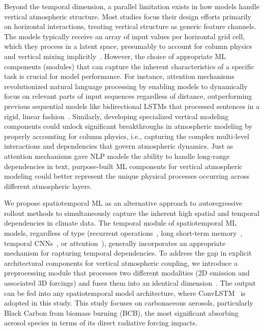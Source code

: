 \documentclass[11pt]{article}
\begin{document}
    Beyond the temporal dimension, a parallel limitation exists in how models handle vertical atmospheric structure. Most studies focus their design efforts primarily on horizontal interactions, treating vertical structure as generic feature channels. The models typically receive an array of input values per horizontal grid cell, which they process in a latent space, presumably to account for column physics and vertical mixing implicitly~\cite{lam2023learning,lang2024aifs}. However, the choice of appropriate ML components (modules) that can capture the inherent characteristics of a specific task is crucial for model performance. For instance, attention mechanisms~\cite{vaswani2017attention} revolutionized natural language processing by enabling models to dynamically focus on relevant parts of input sequences regardless of distance, outperforming previous sequential models like bidirectional LSTMs that processed sentences in a rigid, linear fashion~\cite{peters2018deep}. Similarly, developing specialized vertical modeling components could unlock significant breakthroughs in atmospheric modeling by properly accounting for column physics, i.e., capturing the complex multi-level interactions and dependencies that govern atmospheric dynamics. Just as attention mechanisms gave NLP models the ability to handle long-range dependencies in text, purpose-built ML components for vertical atmospheric modeling could better represent the unique physical processes occurring across different atmospheric layers.

    We propose spatiotemporal ML as an alternative approach to autoregressive rollout methods to simultaneously capture the inherent high spatial and temporal dependencies in climate data. The temporal module of spatiotemporal ML models, regardless of type (recurrent operations~\cite{elman1990finding}, long short-term memory~\cite{graves2012long}, temporal CNNs~\cite{bai2018empirical}, or attention~\cite{vaswani2017attention}), generally incorporates an appropriate mechanism for capturing temporal dependencies. To address the gap in explicit architectural components for vertical atmospheric coupling, we introduce a preprocessing module that processes two different modalities (2D emission and associated 3D forcings) and fuses them into an identical dimension~\cite{tan2023temporal, wang2018recovering}. The output can be fed into any spatiotemporal model architecture, where ConvLSTM~\cite{shi2015convolutional} is adopted in this study. This study focuses on carbonaceous aerosols, particularly Black Carbon from biomass burning (BCB), the most significant absorbing aerosol species in terms of its direct radiative forcing impacts.
    
\end{document}
